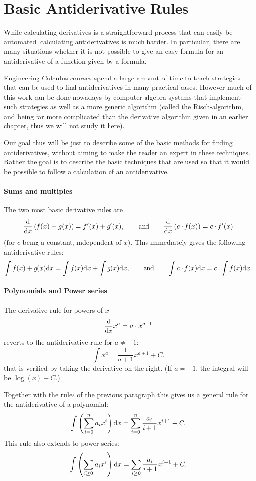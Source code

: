 \section{Basic Antiderivative Rules}

While calculating derivatives is a straightforward process that can easily
be automated, calculating antiderivatives is much harder. In particular,
there are many situations whether it is not possible to give an easy formula
for an antiderivative of a function given by a formula.

Engineering Calculus courses spend a large amount of time to teach
strategies that can be used to find antiderivatives in many practical cases.
However much of this work can be done nowadays by
computer algebra systems that implement such strategies as well as
a more generic algorithm (called
the Risch-algorithm, and being far more complicated than the derivative
algorithm given in an earlier chapter, thus we will not study it here).

Our goal thus will be just to describe some of the basic methods for finding
antiderivatives, without aiming to make the reader an expert in these
techniques. Rather the goal is to describe the basic techniques that are
used so that it would be possible to follow a calculation of an
antiderivative.

\paragraph{Sums and multiples}

The two most basic  derivative rules are 
\[
\frac{\mbox{d}}{\mbox{d}x} \left(f(x)+g(x)\right)=f'(x)+g'(x),\qquad\mbox{and}\qquad
\frac{\mbox{d}}{\mbox{d}x} \left(c\cdot f(x)\right)=c\cdot f'(x)
\]
(for $c$ being a constant, independent of $x$). This immediately gives the
following antiderivative rules:
\[
\int f(x)+g(x){\mbox{d}}x=\int f(x){\mbox{d}}x+\int g(x){\mbox{d}}x,\qquad\mbox{and}\qquad
\int c\cdot f(x){\mbox{d}}x=c\cdot \int f(x){\mbox{d}}x.
\]

\paragraph{Polynomials and Power series}

The derivative rule for powers of $x$:
\[
\frac{\mbox{d}}{\mbox{d}x} x^a=a\cdot x^{a-1}
\]
reverts to the antiderivative rule for $a\not=-1$:
\[
\int x^a=\frac{1}{a+1}x^{a+1}+C.
\]
that is verified by taking the derivative on the right. (If $a=-1$, the
integral will be $\log(x)+C$.)

Together with the rules of the previous paragraph this gives us a general
rule for the antiderivative of a polynomial:
\[
\int\left( \sum_{i=0}^n a_i x^i\right){\mbox{d}}x=
\sum_{i=0}^n \frac{a_i}{i+1} x^{i+1}+C.
\]
This rule also extends to power series:
\[
\int\left( \sum_{i\ge 0} a_i x^i\right){\mbox{d}}x=
\sum_{i\ge 0} \frac{a_i}{i+1} x^{i+1}+C.
\]


